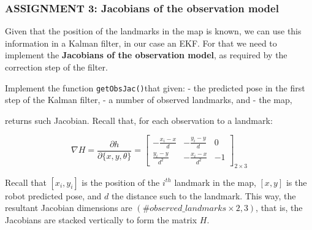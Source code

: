 \documentclass[11pt]{article}
\begin{document}
    \hypertarget{assignment-3-jacobians-of-the-observation-model}{%
\subsubsection{\texorpdfstring{\textbf{{ASSIGNMENT 3: Jacobians of the
observation
model}}}{ASSIGNMENT 3: Jacobians of the observation model}}\label{assignment-3-jacobians-of-the-observation-model}}

Given that the position of the landmarks in the map is known, we can use
this information in a Kalman filter, in our case an EKF. For that we
need to implement the \textbf{Jacobians of the observation model}, as
required by the correction step of the filter.

Implement the function \texttt{getObsJac()}that given: - the predicted
pose in the first step of the Kalman filter, - a number of observed
landmarks, and - the map,

returns such Jacobian. Recall that, for each observation to a landmark:

\[
\nabla H = \frac{\partial h}{\partial \{x,y,\theta \}} =
\begin{bmatrix}
    -\frac{x_i - x}{d} & - \frac{y_i - y}{d} & 0 \\
    \frac{y_i - y}{d^2} & -\frac{x_i - x}{d^2} & -1
\end{bmatrix}_{2 \times 3}
\]

Recall that \([x_i,y_i]\) is the position of the \(i^{th}\) landmark in
the map, \([x,y]\) is the robot predicted pose, and \(d\) the distance
such to the landmark. This way, the resultant Jacobian dimensions are
\((\#observed\_landmarks \times 2, 3)\), that is, the Jacobians are
stacked vertically to form the matrix \(H\).
\end{document}
